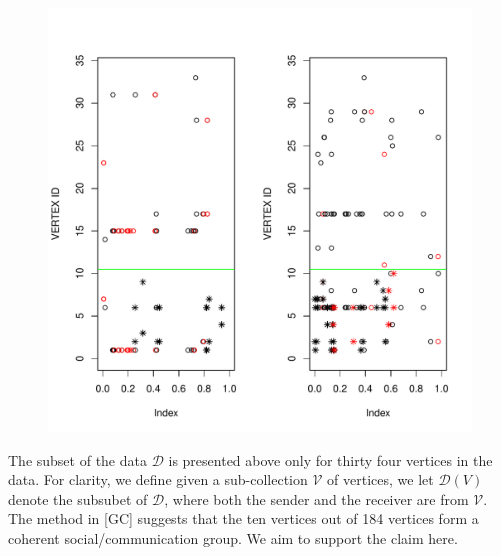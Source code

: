 \documentclass[12pt]{article}%
\begin{document}
\begin{figure}
\begin{center}
\includegraphics[scale=0.50]{myDdata_w38w58.pdf}
\end{center}
\end{figure}
The subset of the data $\mathcal D$ is presented above only for thirty four vertices in the data.  For clarity, we define given a sub-collection $\mathcal V$ of vertices, we let $\mathcal D(V)$ denote the subsubet of $\mathcal D$, where both the sender and the receiver are from $\mathcal V$. The method in [GC] suggests that the ten vertices out of 184 vertices form a coherent social/communication group.   We aim to support the claim here.
\end{document}
